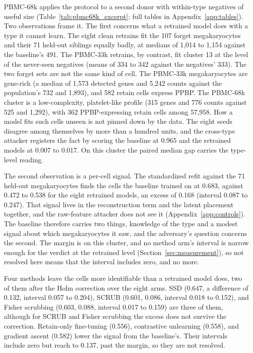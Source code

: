 \documentclass{article}
\begin{document}
PBMC-68k applies the protocol to a second donor with within-type negatives of useful size (Table~\ref{tab:pbmc68k_excerpt}; full tables in Appendix~\ref{app:tables}). Two observations frame it. The first concerns what a retrained model does with a type it cannot learn. The eight clean retrains fit the 107 forget megakaryocytes and their 71 held-out siblings equally badly, at medians of 1,014 to 1,154 against the baseline's 491. The PBMC-33k retrains, by contrast, fit cluster 13 at the level of the never-seen negatives (means of 334 to 342 against the negatives' 333). The two forget sets are not the same kind of cell. The PBMC-33k megakaryocytes are gene-rich (a median of 1,573 detected genes and 5,242 counts against the population's 732 and 1,893), and 582 retain cells express PPBP. The PBMC-68k cluster is a low-complexity, platelet-like profile (315 genes and 776 counts against 525 and 1,292), with 362 PPBP-expressing retain cells among 57,958. How a model fits such cells unseen is not pinned down by the data. The eight seeds disagree among themselves by more than a hundred units, and the cross-type attacker registers the fact by scoring the baseline at 0.965 and the retrained models at 0.007 to 0.017. On this cluster the paired median gap carries the type-level reading.

The second observation is a per-cell signal. The standardized refit against the 71 held-out megakaryocytes finds the cells the baseline trained on at 0.683, against 0.472 to 0.538 for the eight retrained models, an excess of 0.168 (interval 0.087 to 0.247). That signal lives in the reconstruction term and the latent placement together, and the raw-feature attacker does not see it (Appendix~\ref{app:controls}). The baseline therefore carries two things, knowledge of the type and a modest signal about which megakaryocytes it saw, and the adversary's question concerns the second. The margin is  on this cluster, and no method arm's interval is narrow enough for the verdict at the retrained level (Section~\ref{sec:measurement}), so not resolved here means that the interval includes zero, and no more.

Four methods leave the cells more identifiable than a retrained model does, two of them after the Holm correction over the eight arms. SSD (0.647, a difference of 0.132, interval 0.057 to 0.204), SCRUB (0.601, 0.086, interval 0.018 to 0.152), and Fisher scrubbing (0.603, 0.088, interval 0.017 to 0.159) are three of them, although for SCRUB and Fisher scrubbing the excess does not survive the correction. Retain-only fine-tuning (0.556), contrastive unlearning (0.558), and gradient ascent (0.582) lower the signal from the baseline's. Their intervals include zero but reach to 0.137, past the margin, so they are not resolved.
\end{document}
